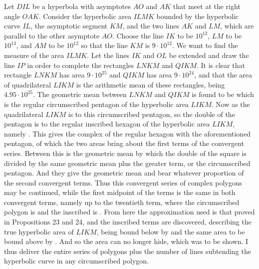 \documentclass[11pt,letterpaper]{book}
\begin{document}
Let $DIL$ be a hyperbola with asymptotes $AO$ and $AK$ that meet at the right
angle $OAK$. 
Consider the hyperbolic area $ILMK$ bounded by the hyperbolic
curve $IL$, the asymptotic segment $KM$, and the two lines $AK$ and $LM$, which
are parallel to the other asymptote $AO$. 
Choose the line $IK$ to be $10^{12}$, $LM$ to be $10^{13}$, and $AM$ to be
$10^{12}$ so that the line $KM$ is $9\cdot 10^{12}$. 
We want to find the measure of the area $ILMK$. 
Let the lines $IK$ and $OL$ be extended and draw the line $IP$ in order to
complete the rectangles $LNKM$ and $QIKM$. 
It is clear that rectangle $LNKM$ has area $9\cdot 10^{25}$ and $QIKM$ has area
$9\cdot 10^{24}$, and that the area of quadrilateral $LIKM$ is the arithmetic
mean of these rectangles, being $4.95\cdot 10^{25}$.
The geometric mean between $LNKM$ and $QIKM$ is found to
be  which is the regular circumscribed
pentagon of the hyperbolic area $LIKM$. 
Now as the quadrilateral $LIKM$ is to this circumscribed pentagon, so the double
of the pentagon is to the regular inscribed hexagon of the hyperbolic area
$LIKM$, namely . 
This gives the complex of the regular hexagon with the aforementioned pentagon,
of which the two areas bring about the first terms of the convergent series.
Between this is the geometric mean by which the double of the square is divided
by the same geometric mean plus the greater term, or the circumscribed
pentagon. 
And they give the geometric mean and bear whatever proportion of the second
convergent terms. 
Thus this convergent series of complex polygons may be continued, while the
first midpoint of the terms is the same in both convergent terms, namely up to
the twentieth term, where the circumscribed polygon is
 and the inscribed is
. 
From here the approximation used is that proved in Propositions 23 and 24, and
the inscribed terms are discovered, describing the true hyperbolic area of
$LIKM$, being bound below by  and the same
area to be bound above by . 
And so the area can no longer hide, which was to be shown. I thus deliver the
entire series of polygons plus the number of lines subtending the hyperbolic
curve in any circumscribed polygon.
\end{document}

